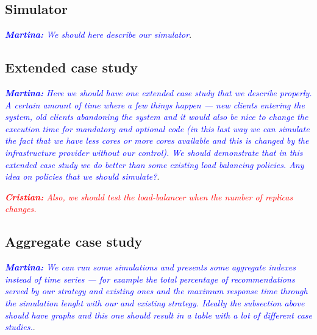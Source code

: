 \subsection{Simulator}

\textcolor{blue}{\textit{\textbf{Martina:} We should here describe our
    simulator}}.

\subsection{Extended case study}

\textcolor{blue}{\textit{\textbf{Martina:} Here we should have one
    extended case study that we describe properly. A certain amount of
    time where a few things happen --- new clients entering the
    system, old clients abandoning the system and it would also be
    nice to change the execution time for mandatory and optional code
    (in this last way we can simulate the fact that we have less cores
    or more cores available and this is changed by the infrastructure
    provider without our control). We should demonstrate that in this
    extended case study we do better than some existing load balancing
    policies. Any idea on policies that we should simulate?}}.

\textcolor{red}{\textit{\textbf{Cristian:} Also, we should test the load-balancer
	when the number of replicas changes.}}

\subsection{Aggregate case study}

\textcolor{blue}{\textit{\textbf{Martina:} We can run some simulations
    and presents some aggregate indexes instead of time series --- for
    example the total percentage of recommendations served by our
    strategy and existing ones and the maximum response time through
    the simulation lenght with our and existing strategy. Ideally the
    subsection above should have graphs and this one should result in
    a table with a lot of different case studies.}}.



